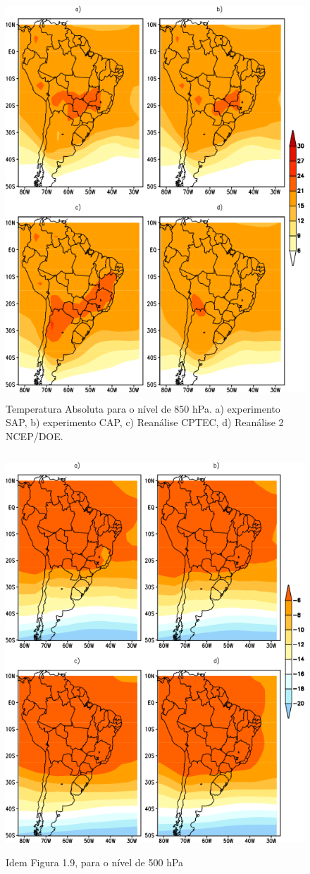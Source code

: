 \begin{figure}[!hbp]
\centering
\includegraphics[height=15cm]{./figs/media_temp_anl_850hPa.png}
\caption{Temperatura Absoluta para o nível de 850 hPa. a) experimento SAP, b) experimento CAP, c) Reanálise CPTEC, d) Reanálise 2 NCEP/DOE.}
\label{fig39}
\end{figure}

\begin{figure}[!hbp]
\centering
\includegraphics[height=15cm]{./figs/media_temp_anl_500hPa.png}
\caption{Idem Figura 1.9, para o nível de 500 hPa}
\label{fig40}
\end{figure}

